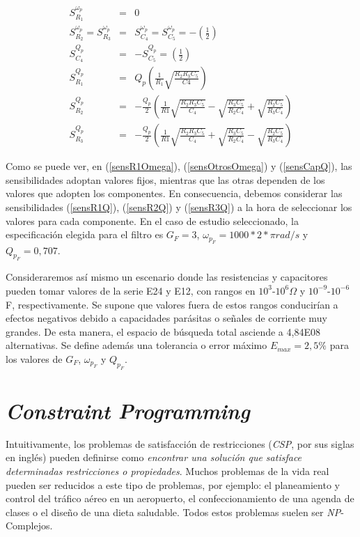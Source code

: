 \documentclass{llncs}
\begin{document}
	\begin{eqnarray}
		S_{R_1}^{\omega_p} &=& 0 \label{sensR1Omega}\\
		S_{R_2}^{\omega_p} = S_{R_3}^{\omega_p} &=& S_{C_4}^{\omega_p} = S_{C_5}^{\omega_p} = -\left(\frac{1}{2}\right) \label{sensOtrosOmega}\\
		S_{C_4}^{Q_p} &=& - S_{C_5}^{Q_p} = \left(\frac{1}{2}\right) \label{sensCapQ}\\
		S_{R_1}^{Q_p} &=& Q_p \left(\frac{1}{R_1} \sqrt{\frac{R_2 R_3 C_5}{C4}}\right) \label{sensR1Q}\\
		S_{R_2}^{Q_p} &=& - \frac{Q_p}{2} \left(\frac{1}{R1} \sqrt{\frac{R_2 R_3 C_5}{C_4}} - \sqrt{\frac{R_3 C_5}{R_2 C_4}} + \sqrt{\frac{R_2 C_5}{R_3 C_4}}\right) \label{sensR2Q}\\
		S_{R_3}^{Q_p} &=& - \frac{Q_p}{2} \left(\frac{1}{R1} \sqrt{\frac{R_2 R_3 C_5}{C_4}} + \sqrt{\frac{R_3 C_5}{R_2 C_4}} - \sqrt{\frac{R_2 C_5}{R_3 C_4}}\right) \label{sensR3Q}
	\end{eqnarray}
	
	Como se puede ver, en (\ref{sensR1Omega}), (\ref{sensOtrosOmega}) y (\ref{sensCapQ}), las
	sensibilidades adoptan valores fijos, mientras que las otras dependen de los valores que adopten los componentes. 
	En consecuencia, debemos considerar las sensibilidades (\ref{sensR1Q}), (\ref{sensR2Q}) y (\ref{sensR3Q}) 
	a la hora de seleccionar los valores para cada componente.
	En el caso de estudio seleccionado, la especificación elegida para el filtro es $G_F = 3$,
	$\omega_{p_F}=1000*2*\pi rad/s$ y $Q_{p_F} = 0,707$. 
	
	Consideraremos así mismo un escenario donde las resistencias y capacitores pueden tomar valores de la serie E24 y E12, con rangos en $10^3$-$10^6$$\Omega$ y $10^{-9}$-$10^{-6}$F, respectivamente. Se supone que valores fuera de estos rangos conducirían a efectos negativos debido a capacidades parásitas o señales de corriente muy grandes. De esta manera, el espacio de búsqueda total asciende a 4,84E08 alternativas. Se
	define además una tolerancia o error máximo $E_{max} = 2,5\%$ para los valores de $G_F$,
	$\omega_{p_F}$ y $Q_{p_F}$.
	
    
  \section{\textbf{\textit{Constraint Programming}}}
    \label{sec:fundprog}
    Intuitivamente, los problemas de satisfacción de restricciones (\textit{CSP}, por sus siglas en inglés) pueden definirse como \textit{encontrar una solución que satisface determinadas restricciones o pro\-pie\-da\-des}. Muchos problemas de la vida real pueden ser reducidos a 
    este tipo de problemas, por ejemplo: el planeamiento y control del tráfico aéreo en un aeropuerto, el confeccionamiento de una agenda de clases o el diseño de una dieta saludable. 
    Todos estos problemas suelen ser \textit{NP}-Complejos.
    
\end{document}
